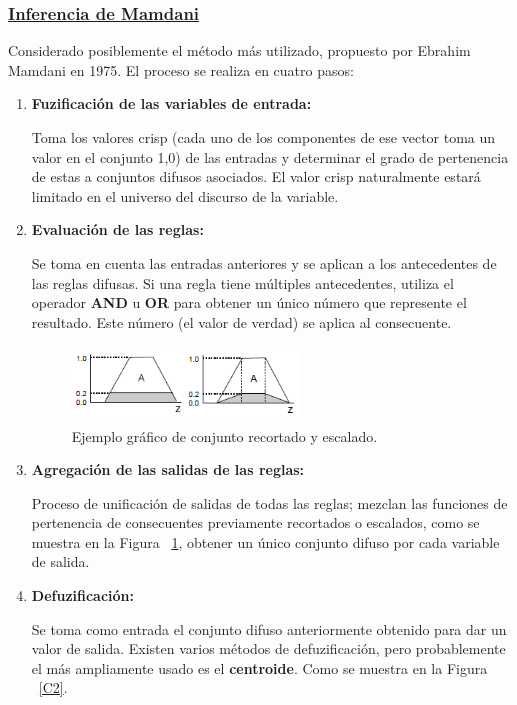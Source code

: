 \documentclass[10pt,conference]{IEEEtran}
\begin{document}
\subsubsection{\textbf{\underline{Inferencia de Mamdani}}}
Considerado posiblemente el método más utilizado, propuesto
por Ebrahim Mamdani en 1975. El proceso se realiza en cuatro pasos:
\begin{enumerate}
    \item \textbf{Fuzificación de las variables de entrada:}
    \par
    Toma los valores crisp (cada uno de los componentes de ese vector toma un valor en el conjunto {1,0}) de las entradas y determinar el grado de pertenencia de estas a conjuntos difusos asociados. El valor crisp naturalmente estará limitado en el universo del discurso de la variable.
    \item \textbf{Evaluación de las reglas:}
    \par
    Se toma en cuenta las entradas anteriores y se aplican a los antecedentes de las reglas difusas. Si una regla tiene múltiples antecedentes, utiliza el operador \textbf{AND} u \textbf{OR} para obtener un único número que represente el resultado. Este número (el valor de verdad) se aplica al consecuente.

    \begin{figure}[H]
    \begin{center}
    \includegraphics[width=6cm,height=2cm]{figuras/conesca.PNG}
    \caption{Ejemplo gráfico de conjunto recortado y escalado.}
    \label{C1} 
    \end{center}
    \end{figure}

    \item \textbf{Agregación de las salidas de las reglas:}
    \par
    Proceso de unificación de salidas de todas las reglas; mezclan las funciones de pertenencia de consecuentes previamente recortados o escalados, como se muestra en la Figura ~\ref{C1}, obtener un único conjunto difuso por cada variable de salida.
    
    \item \textbf{Defuzificación:} 
    \par
    Se toma como entrada el conjunto difuso anteriormente obtenido para dar un valor de salida. Existen varios métodos de defuzificación, pero probablemente el más ampliamente usado es el \textbf{centroide}. Como se muestra en la Figura ~\ref{C2}.
    

\end{enumerate}
\end{document}
